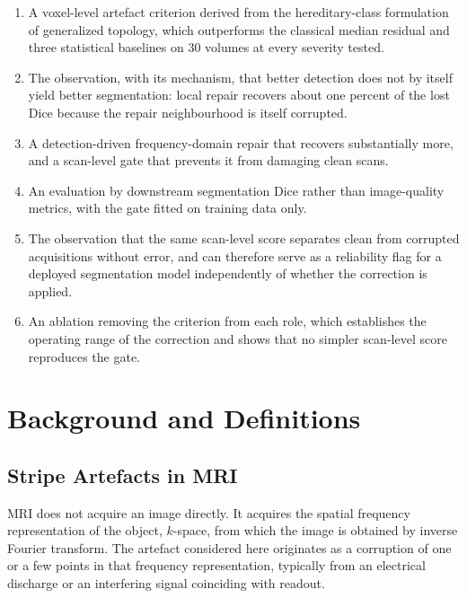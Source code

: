 \documentclass[12pt]{article}
\theoremstyle{definition}
\theoremstyle{plain}
\begin{document}
\begin{enumerate}
    \item A voxel-level artefact criterion derived from the hereditary-class
          formulation of generalized topology, which outperforms the classical
          median residual and three statistical baselines on 30 volumes at every
          severity tested.
    \item The observation, with its mechanism, that better detection does not by
          itself yield better segmentation: local repair recovers about one percent
          of the lost Dice because the repair neighbourhood is itself corrupted.
    \item A detection-driven frequency-domain repair that recovers substantially
          more, and a scan-level gate that prevents it from damaging clean scans.
    \item An evaluation by downstream segmentation Dice rather than image-quality
          metrics, with the gate fitted on training data only.
    \item The observation that the same scan-level score separates clean from
          corrupted acquisitions without error, and can therefore serve as a
          reliability flag for a deployed segmentation model independently of
          whether the correction is applied.
    \item An ablation removing the criterion from each role, which establishes the
          operating range of the correction and shows that no simpler scan-level
          score reproduces the gate.
\end{enumerate}

\section{Background and Definitions}

\subsection{Stripe Artefacts in MRI}

MRI does not acquire an image directly. It acquires the spatial frequency
representation of the object, $k$-space, from which the image is obtained by inverse
Fourier transform. The artefact considered here originates as a corruption of one or
a few points in that frequency representation, typically from an electrical
discharge or an interfering signal coinciding with readout.
\end{document}
